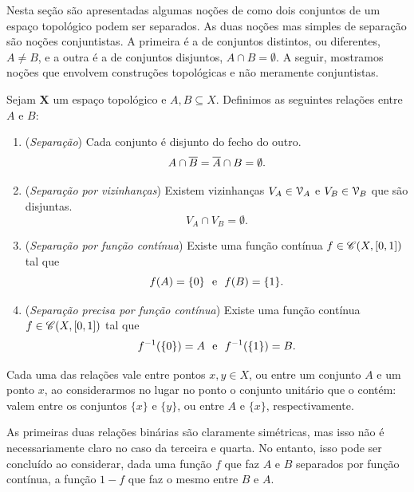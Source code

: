 Nesta seção são apresentadas algumas noções de como dois conjuntos de um espaço topológico podem ser separados. As duas noções mas simples de separação são noções conjuntistas. A primeira é a de conjuntos distintos, ou diferentes, $A \neq B$, e a outra é a de conjuntos disjuntos, $A \cap B = \emptyset$. A seguir, mostramos noções que envolvem construções topológicas e não meramente conjuntistas.

\begin{definition}
Sejam $\bm X$ um espaço topológico e $A,B \subseteq X$. Definimos as seguintes relações entre $A$ e $B$:
	\begin{enumerate}
	\item (\emph{Separação}) Cada conjunto é disjunto do fecho do outro.
	\begin{equation*}
	A \cap \overline{B} = \overline{A} \cap B = \emptyset.
	\end{equation*}
	\item (\emph{Separação por vizinhanças}) Existem vizinhanças $V_A \in \mathcal{V}_A$ e $V_B \in \mathcal{V}_B$ que são disjuntas.
	\begin{equation*}
	V_A \cap V_B = \emptyset.
	\end{equation*}
	\item (\emph{Separação por função contínua}) Existe uma função contínua $f \in \mathscr{C}(X,[0,1])$ tal que
	\begin{equation*}
	f(A)=\{0\} \text{\ \ e\ \ } f(B)=\{1\}.
	\end{equation*}
	\item (\emph{Separação precisa por função contínua}) Existe uma função contínua $f \in \mathscr{C}(X,[0,1])$ tal que
	\begin{equation*}
	f^{-1}(\{0\})=A \text{\ \ e\ \ } f^{-1}(\{1\})=B.
	\end{equation*}
	\end{enumerate}
Cada uma das relações vale entre pontos $x,y \in X$, ou entre um conjunto $A$ e um ponto $x$, ao considerarmos no lugar no ponto o conjunto unitário que o contém: valem entre os conjuntos $\{x\}$ e $\{y\}$, ou entre $A$ e $\{x\}$, respectivamente.
\end{definition}

	As primeiras duas relações binárias são claramente simétricas, mas isso não é necessariamente claro no caso da terceira e quarta. No entanto, isso pode ser concluído ao considerar, dada uma função $f$ que faz $A$ e $B$ separados por função contínua, a função $1-f$ que faz o mesmo entre $B$ e $A$.


